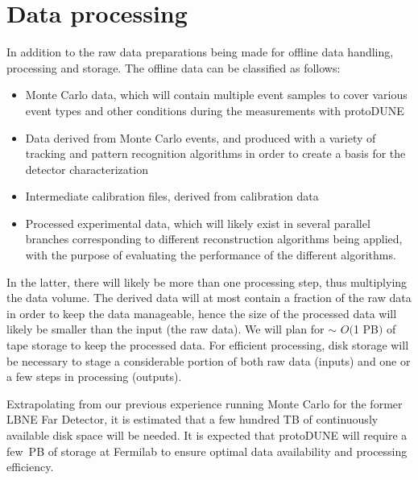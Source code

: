 \documentclass[12pt]{article}
\begin{document}
{\section{Data processing}
\label{sec:protodune-dataprocess}

In addition to the raw data preparations being made for offline data handling, processing and storage.
The offline data can be classified as follows:
\begin{itemize}
\item Monte Carlo data, which will contain multiple event samples to cover various event types and other conditions during the measurements
with protoDUNE

\item Data derived from Monte Carlo events, and produced with a variety of tracking and pattern recognition algorithms
in order to create a basis for the detector characterization

\item Intermediate calibration files, derived from calibration data

\item Processed experimental data, which will likely exist in several parallel branches corresponding to different reconstruction
algorithms being applied, with the purpose of evaluating the performance of the different algorithms.
\end{itemize}

\noindent In the latter, there will likely be more than one processing step, thus multiplying the data volume. 
The derived data will at most contain a fraction of the raw data in order to keep the data manageable,
hence the size of the processed data will likely be smaller than the input (the raw data). 
We will plan for $\sim$ $O($1 PB$)$ of tape storage to keep the processed data. 
For efficient processing, disk storage will be necessary to stage a considerable portion of both raw
data (inputs) and one or a few steps in processing (outputs).

Extrapolating from our previous experience running Monte Carlo for the former LBNE Far Detector, it is estimated
that  a few hundred TB of continuously available disk space will be needed. It is expected that protoDUNE will require
a few~PB of storage at Fermilab to ensure optimal data availability and  processing efficiency. 

}
\end{document}

